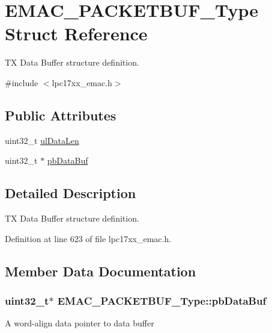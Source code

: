 \hypertarget{struct_e_m_a_c___p_a_c_k_e_t_b_u_f___type}{\section{\-E\-M\-A\-C\-\_\-\-P\-A\-C\-K\-E\-T\-B\-U\-F\-\_\-\-Type \-Struct \-Reference}
\label{struct_e_m_a_c___p_a_c_k_e_t_b_u_f___type}
}


\-T\-X \-Data \-Buffer structure definition.  




{\ttfamily \#include $<$lpc17xx\-\_\-emac.\-h$>$}

\subsection*{\-Public \-Attributes}
\begin{DoxyCompactItemize}
\item 
uint32\-\_\-t \hyperlink{struct_e_m_a_c___p_a_c_k_e_t_b_u_f___type_a7655226b4b619faf68afa8fa753aad84}{ul\-Data\-Len}
\item 
uint32\-\_\-t $\ast$ \hyperlink{struct_e_m_a_c___p_a_c_k_e_t_b_u_f___type_ad2a6c47c85f332e79d337fcb7aa6e568}{pb\-Data\-Buf}
\end{DoxyCompactItemize}


\subsection{\-Detailed \-Description}
\-T\-X \-Data \-Buffer structure definition. 

\-Definition at line 623 of file lpc17xx\-\_\-emac.\-h.



\subsection{\-Member \-Data \-Documentation}
\hypertarget{struct_e_m_a_c___p_a_c_k_e_t_b_u_f___type_ad2a6c47c85f332e79d337fcb7aa6e568}{
\subsubsection[{pb\-Data\-Buf}]{\setlength{\rightskip}{0pt plus 5cm}uint32\-\_\-t$\ast$ {\bf \-E\-M\-A\-C\-\_\-\-P\-A\-C\-K\-E\-T\-B\-U\-F\-\_\-\-Type\-::pb\-Data\-Buf}}}\label{struct_e_m_a_c___p_a_c_k_e_t_b_u_f___type_ad2a6c47c85f332e79d337fcb7aa6e568}
\-A word-\/align data pointer to data buffer 

